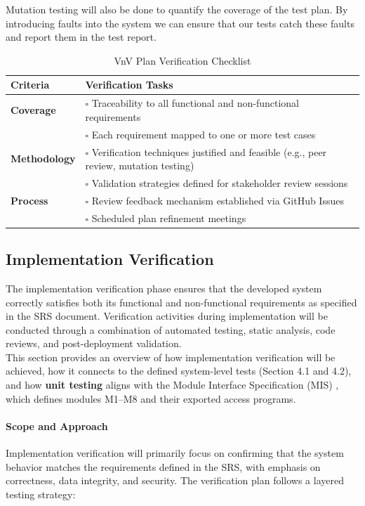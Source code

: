 \documentclass[12pt, titlepage]{article}
\begin{document}
Mutation testing will also be done to quantify the coverage of the test plan. By introducing faults into the system we can ensure that our tests catch these faults and report them in the test report.

\begin{table}[H]
\centering
\caption{VnV Plan Verification Checklist}
\begin{tabular}{p{4cm}p{10cm}}
\toprule
\textbf{Criteria} & \textbf{Verification Tasks} \\
\midrule
\textbf{Coverage} &
$\square$ Traceability to all functional and non-functional requirements \\
& $\square$ Each requirement mapped to one or more test cases \\[0.5em]
\hline
\textbf{Methodology} &
$\square$ Verification techniques justified and feasible (e.g., peer review, mutation testing) \\
& $\square$ Validation strategies defined for stakeholder review sessions \\[0.5em]
\hline
\textbf{Process} &
$\square$ Review feedback mechanism established via GitHub Issues \\
& $\square$ Scheduled plan refinement meetings \\[0.5em]
\bottomrule
\end{tabular}
\end{table}

\subsection{Implementation Verification}

The implementation verification phase ensures that the developed system correctly satisfies both its functional and non-functional requirements as specified in the SRS document. Verification activities during implementation will be conducted through a combination of automated testing, static analysis, code reviews, and post-deployment validation.\\
\noindent \newline This section provides an overview of how implementation verification will be achieved, how it connects to the defined system-level tests (Section 4.1 and 4.2), and how \textbf{unit testing} aligns with the Module Interface Specification (MIS) \citet{SL-MIS}, which defines modules M1--M8 and their exported access programs.

\paragraph{Scope and Approach}
\noindent \newline
\noindent Implementation verification will primarily focus on confirming that the system behavior matches the requirements defined in the SRS, with emphasis on correctness, data integrity, and security. The verification plan follows a layered testing strategy:
\end{document}
